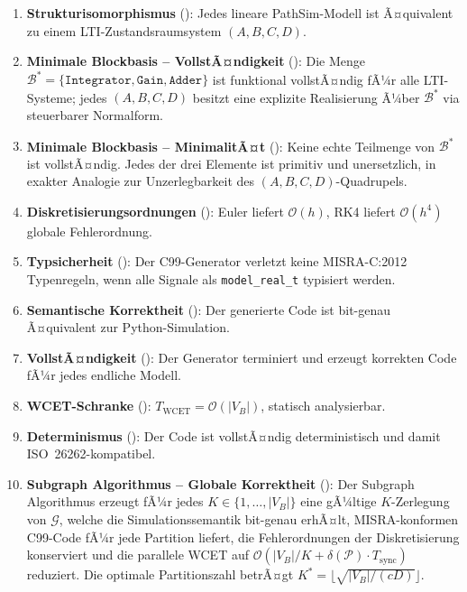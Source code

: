 ﻿\documentclass[12pt,a4paper]{article}
\theoremstyle{definition}
\begin{document}
\begin{enumerate}[label=\textbf{S\arabic*.}]
  \item \textbf{Strukturisomorphismus} (): Jedes lineare PathSim-Modell
        ist Ã¤quivalent zu einem LTI-Zustandsraumsystem $(A,B,C,D)$.
  \item \textbf{Minimale Blockbasis -- VollstÃ¤ndigkeit} ():
        Die Menge $\mathcal{B}^* = \{\texttt{Integrator}, \texttt{Gain},
        \texttt{Adder}\}$ ist funktional vollstÃ¤ndig fÃ¼r alle LTI-Systeme;
        jedes $(A,B,C,D)$ besitzt eine explizite Realisierung Ã¼ber $\mathcal{B}^*$
        via steuerbarer Normalform.
  \item \textbf{Minimale Blockbasis -- MinimalitÃ¤t} ():
        Keine echte Teilmenge von $\mathcal{B}^*$ ist vollstÃ¤ndig. Jedes
        der drei Elemente ist primitiv und unersetzlich, in exakter Analogie
        zur Unzerlegbarkeit des $(A,B,C,D)$-Quadrupels.
  \item \textbf{Diskretisierungsordnungen} (): Euler liefert
        $\mathcal{O}(h)$, RK4 liefert $\mathcal{O}(h^4)$ globale Fehlerordnung.
  \item \textbf{Typsicherheit} (): Der C99-Generator verletzt
        keine MISRA-C:2012 Typenregeln, wenn alle Signale als
        \texttt{model\_real\_t} typisiert werden.
  \item \textbf{Semantische Korrektheit} (): Der generierte
        Code ist bit-genau Ã¤quivalent zur Python-Simulation.
  \item \textbf{VollstÃ¤ndigkeit} (): Der Generator terminiert
        und erzeugt korrekten Code fÃ¼r jedes endliche Modell.
  \item \textbf{WCET-Schranke} (): $T_{\mathrm{WCET}} = \mathcal{O}(|V_B|)$,
        statisch analysierbar.
  \item \textbf{Determinismus} (): Der Code ist vollstÃ¤ndig
        deterministisch und damit ISO~26262-kompatibel.
  \item \textbf{Subgraph Algorithmus -- Globale Korrektheit}
        ():
        Der Subgraph Algorithmus erzeugt fÃ¼r jedes $K \in \{1,\ldots,|V_B|\}$
        eine gÃ¼ltige $K$-Zerlegung von $\mathcal{G}$, welche die
        Simulationssemantik bit-genau erhÃ¤lt, MISRA-konformen C99-Code
        fÃ¼r jede Partition liefert, die Fehlerordnungen der Diskretisierung
        konserviert und die parallele WCET auf
        $\mathcal{O}(|V_B|/K + \delta(\mathcal{P}) \cdot T_{\mathrm{sync}})$
        reduziert. Die optimale Partitionszahl betrÃ¤gt
        $K^* = \lfloor\sqrt{|V_B|/(cD)}\rfloor$.
\end{enumerate}
\end{document}
